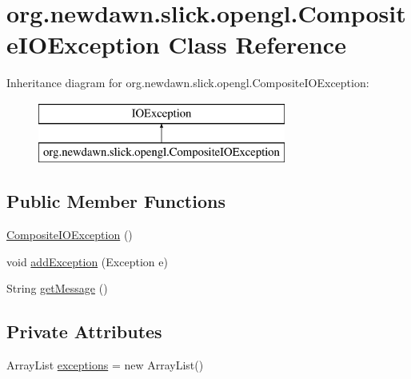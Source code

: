 \hypertarget{classorg_1_1newdawn_1_1slick_1_1opengl_1_1_composite_i_o_exception}{}\section{org.\+newdawn.\+slick.\+opengl.\+Composite\+I\+O\+Exception Class Reference}
\label{classorg_1_1newdawn_1_1slick_1_1opengl_1_1_composite_i_o_exception}
Inheritance diagram for org.\+newdawn.\+slick.\+opengl.\+Composite\+I\+O\+Exception\+:\begin{figure}[H]
\begin{center}
\leavevmode
\includegraphics[height=2.000000cm]{classorg_1_1newdawn_1_1slick_1_1opengl_1_1_composite_i_o_exception}
\end{center}
\end{figure}
\subsection*{Public Member Functions}
\begin{DoxyCompactItemize}
\item 
\mbox{\hyperlink{classorg_1_1newdawn_1_1slick_1_1opengl_1_1_composite_i_o_exception_a8407eeb11073c55e818e112bd956ac2e}{Composite\+I\+O\+Exception}} ()
\item 
void \mbox{\hyperlink{classorg_1_1newdawn_1_1slick_1_1opengl_1_1_composite_i_o_exception_a9e9c1fac074fa05e0bc43dbe72a57b66}{add\+Exception}} (Exception e)
\item 
String \mbox{\hyperlink{classorg_1_1newdawn_1_1slick_1_1opengl_1_1_composite_i_o_exception_a2e50a6e1acf81ff82b05214c2c04b1f8}{get\+Message}} ()
\end{DoxyCompactItemize}
\subsection*{Private Attributes}
\begin{DoxyCompactItemize}
\item 
Array\+List \mbox{\hyperlink{classorg_1_1newdawn_1_1slick_1_1opengl_1_1_composite_i_o_exception_af43e5dc3fe90a30ae72aab39b866349a}{exceptions}} = new Array\+List()
\end{DoxyCompactItemize}


